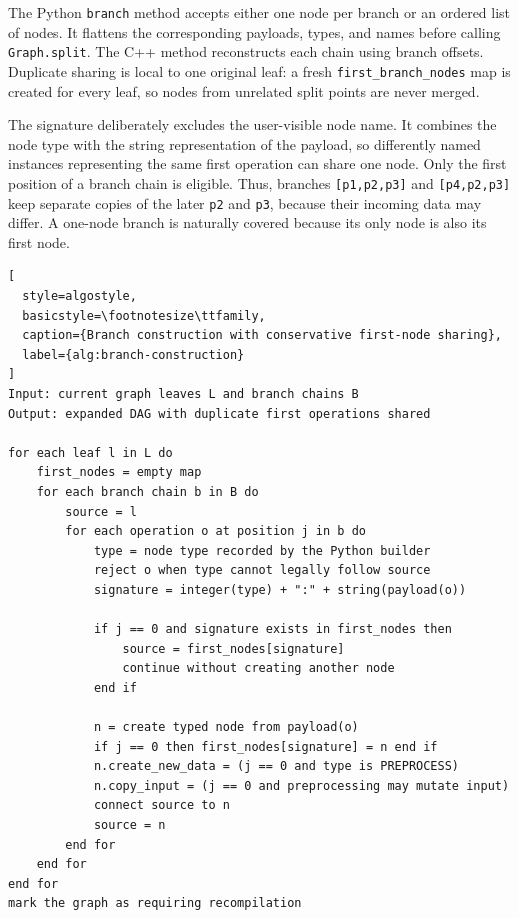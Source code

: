 \documentclass[12pt,a4paper,oneside]{report}
\begin{document}
The Python \texttt{branch} method accepts either one node per branch or an
ordered list of nodes. It flattens the corresponding payloads, types, and names
before calling \texttt{Graph.split}. The C++ method reconstructs each chain using
branch offsets. Duplicate sharing is local to one original leaf: a fresh
\texttt{first\_branch\_nodes} map is created for every leaf, so nodes from
unrelated split points are never merged.

The signature deliberately excludes the user-visible node name. It combines the
node type with the string representation of the payload, so differently named
instances representing the same first operation can share one node. Only the
first position of a branch chain is eligible. Thus, branches
\texttt{[p1,p2,p3]} and \texttt{[p4,p2,p3]} keep separate copies of the later
\texttt{p2} and \texttt{p3}, because their incoming data may differ. A one-node
branch is naturally covered because its only node is also its first node.

\clearpage

\noindent\begin{minipage}{\textwidth}
\begin{lstlisting}[
  style=algostyle,
  basicstyle=\footnotesize\ttfamily,
  caption={Branch construction with conservative first-node sharing},
  label={alg:branch-construction}
]
Input: current graph leaves L and branch chains B
Output: expanded DAG with duplicate first operations shared

for each leaf l in L do
    first_nodes = empty map
    for each branch chain b in B do
        source = l
        for each operation o at position j in b do
            type = node type recorded by the Python builder
            reject o when type cannot legally follow source
            signature = integer(type) + ":" + string(payload(o))

            if j == 0 and signature exists in first_nodes then
                source = first_nodes[signature]
                continue without creating another node
            end if

            n = create typed node from payload(o)
            if j == 0 then first_nodes[signature] = n end if
            n.create_new_data = (j == 0 and type is PREPROCESS)
            n.copy_input = (j == 0 and preprocessing may mutate input)
            connect source to n
            source = n
        end for
    end for
end for
mark the graph as requiring recompilation
\end{lstlisting}
\end{minipage}
\end{document}
